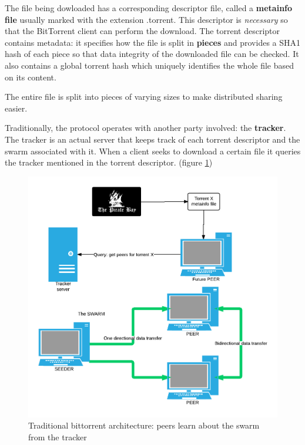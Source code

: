 \documentclass[11pt]{book} %
\begin{document}
The file being dowloaded has a corresponding descriptor file, called a \textbf{metainfo file} usually marked with the extension .torrent. This descriptor is \textit{necessary} so that the BitTorrent client can perform the download. The torrent descriptor contains metadata: it specifies how the file is split in \textbf{pieces} and provides a SHA1 hash of each piece so that data integrity of the downloaded file can be checked. It also contains a global torrent hash which uniquely identifies the whole file based on its content.

The entire file is split into pieces of varying sizes to make distributed sharing easier.

Traditionally, the protocol operates with another party involved: the \textbf{tracker}. The tracker is an actual server that keeps track of each torrent descriptor and the swarm associated with it. When a client seeks to download a certain file it queries the tracker mentioned in the torrent descriptor. (figure \ref{fig:btClassic})

\begin{figure}[h!]
\begin{center}
\includegraphics[scale=0.4]{btClassic}
\end{center}
 \caption{Traditional bittorrent architecture: peers learn about the swarm from the tracker}
 \label{fig:btClassic}
 \end{figure}
\end{document}
